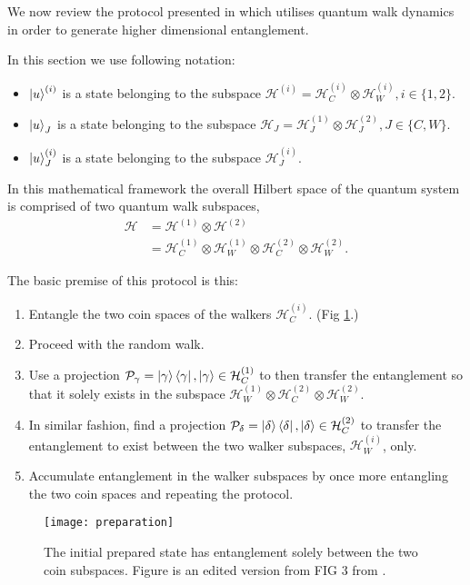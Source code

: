 We now review the protocol presented in \cite{giordani2020} which utilises quantum walk dynamics in order to generate higher dimensional entanglement. 

In this section we use following notation:
\begin{itemize}
    \item $\ket{u}^{(i)}$ is a state belonging to the subspace $\mathcal{H}^{(i)} = \mathcal{H}^{(i)}_C \otimes \mathcal{H}^{(i)}_W, i\in\{1,2\}$.
    \item $\ket{u}_J$ is a state belonging to the subspace $\mathcal{H}_J = \mathcal{H}^{(1)}_J \otimes \mathcal{H}^{(2)}_J, J\in\{C,W\}$.
    \item  $\ket{u}^{(i)}_J$ is a state belonging to the subspace $\mathcal{H}^{(i)}_J$.
\end{itemize}

In this mathematical framework the overall Hilbert space of the quantum system is comprised of two quantum walk subspaces,
\begin{align}
    \mathcal{H} &= \mathcal{H}^{(1)} \otimes \mathcal{H}^{(2)}\\
                &= \mathcal{H}^{(1)}_C \otimes \mathcal{H}^{(1)}_W \otimes \mathcal{H}^{(2)}_C \otimes \mathcal{H}^{(2)}_W.
\end{align}

The basic premise of this protocol is this:
\begin{enumerate}
    \item Entangle the two coin spaces of the walkers $\mathcal{H}^{(i)}_C$. (Fig \ref{fig:preparation}.)
    \item Proceed with the random walk.
    \item Use a projection $\mathcal{P}_\gamma = \ket{\gamma}\bra{\gamma}, \ket{\gamma}\in\mathcal{H}^{(1)}_C$ to then transfer the entanglement so that it solely exists in the subspace $\mathcal{H}^{(1)}_W \otimes \mathcal{H}^{(2)}_C \otimes \mathcal{H}^{(2)}_W$.
    \item In similar fashion, find a projection $\mathcal{P}_\delta = \ket{\delta}\bra{\delta}, \ket{\delta}\in\mathcal{H}^{(2)}_C$ to transfer the entanglement to exist between the two walker subspaces, $\mathcal{H}^{(i)}_W$, only. 
    \item Accumulate entanglement in the walker subspaces by once more entangling the two coin spaces and repeating the protocol.
\end{enumerate}

\begin{figure}
    \centering
    \texttt{[image: preparation]}
    \caption{The initial prepared state has entanglement solely between the two coin subspaces. Figure is an edited version from FIG 3 from \cite{giordani2020}.}
    \label{fig:preparation}
\end{figure}

